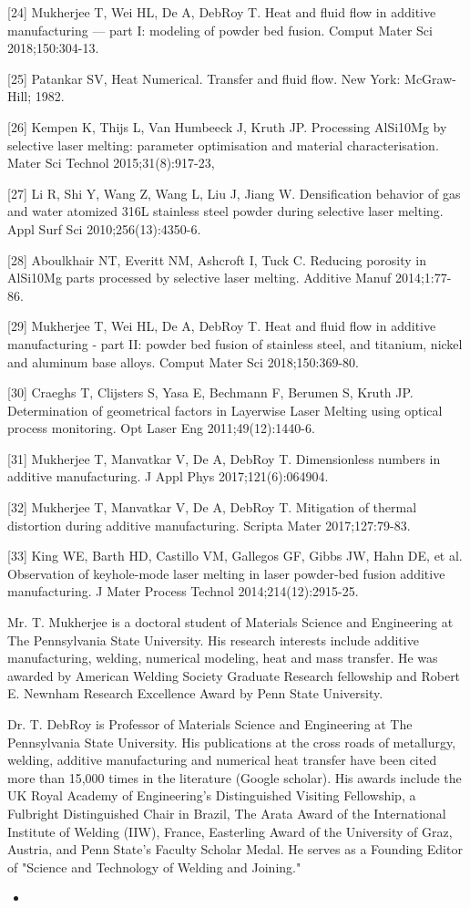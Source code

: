 \documentclass[10pt]{article}
\begin{document}
[24] Mukherjee T, Wei HL, De A, DebRoy T. Heat and fluid flow in additive manufacturing — part I: modeling of powder bed fusion. Comput Mater Sci 2018;150:304-13.

[25] Patankar SV, Heat Numerical. Transfer and fluid flow. New York: McGraw-Hill; 1982.

[26] Kempen K, Thijs L, Van Humbeeck J, Kruth JP. Processing AlSi10Mg by selective laser melting: parameter optimisation and material characterisation. Mater Sci Technol 2015;31(8):917-23,

[27] Li R, Shi Y, Wang Z, Wang L, Liu J, Jiang W. Densification behavior of gas and water atomized 316L stainless steel powder during selective laser melting. Appl Surf Sci 2010;256(13):4350-6.

[28] Aboulkhair NT, Everitt NM, Ashcroft I, Tuck C. Reducing porosity in AlSi10Mg parts processed by selective laser melting. Additive Manuf 2014;1:77-86.

[29] Mukherjee T, Wei HL, De A, DebRoy T. Heat and fluid flow in additive manufacturing - part II: powder bed fusion of stainless steel, and titanium, nickel and aluminum base alloys. Comput Mater Sci 2018;150:369-80.

[30] Craeghs T, Clijsters S, Yasa E, Bechmann F, Berumen S, Kruth JP. Determination of geometrical factors in Layerwise Laser Melting using optical process monitoring. Opt Laser Eng 2011;49(12):1440-6.

[31] Mukherjee T, Manvatkar V, De A, DebRoy T. Dimensionless numbers in additive manufacturing. J Appl Phys 2017;121(6):064904.

[32] Mukherjee T, Manvatkar V, De A, DebRoy T. Mitigation of thermal distortion during additive manufacturing. Scripta Mater 2017;127:79-83.

[33] King WE, Barth HD, Castillo VM, Gallegos GF, Gibbs JW, Hahn DE, et al. Observation of keyhole-mode laser melting in laser powder-bed fusion additive manufacturing. J Mater Process Technol 2014;214(12):2915-25.

Mr. T. Mukherjee is a doctoral student of Materials Science and Engineering at The Pennsylvania State University. His research interests include additive manufacturing, welding, numerical modeling, heat and mass transfer. He was awarded by American Welding Society Graduate Research fellowship and Robert E. Newnham Research Excellence Award by Penn State University.

Dr. T. DebRoy is Professor of Materials Science and Engineering at The Pennsylvania State University. His publications at the cross roads of metallurgy, welding, additive manufacturing and numerical heat transfer have been cited more than 15,000 times in the literature (Google scholar). His awards include the UK Royal Academy of Engineering's Distinguished Visiting Fellowship, a Fulbright Distinguished Chair in Brazil, The Arata Award of the International Institute of Welding (IIW), France, Easterling Award of the University of Graz, Austria, and Penn State's Faculty Scholar Medal. He serves as a Founding Editor of "Science and Technology of Welding and Joining."

\begin{itemize}
  \item 
\end{itemize}
\end{document}
